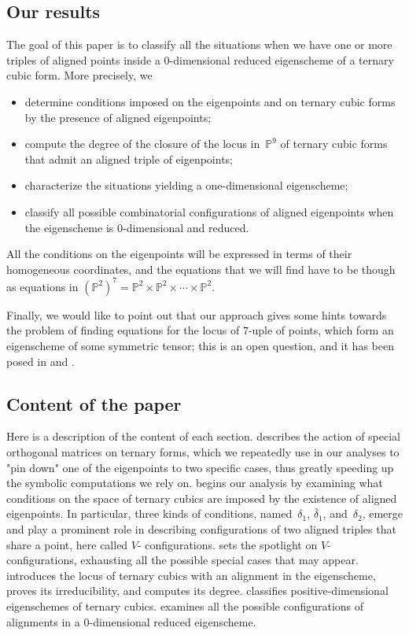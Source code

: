 \documentclass[a4paper, 11pt, reqno]{amsart}
\theoremstyle{plain}
\theoremstyle{definition}
\newcommand{\p}{\mathbb{P}}
\begin{document}
\subsection*{Our results}
The goal of this paper is to classify all the situations when we have one or more triples of aligned points inside a $0$-dimensional reduced eigenscheme of a ternary cubic form.
More precisely, we
%
\begin{itemize}
    \item determine conditions imposed on the eigenpoints and on ternary cubic forms by the presence of aligned eigenpoints;
    \item compute the degree of the closure of the locus in~$\p^9$ of ternary cubic forms that admit an aligned triple of eigenpoints;
    \item characterize the situations yielding a one-dimensional eigenscheme;
    \item classify all possible combinatorial configurations of aligned eigenpoints when the eigenscheme is $0$-dimensional and reduced.
\end{itemize}
%
All the conditions on the eigenpoints will be expressed in terms of their homogeneous coordinates, and the equations that we will find have to be though as equations in $(\p^2)^7=\p^2 \times \p^2 \times \dotsb \times \p^2$.

Finally, we would like to point out that our approach gives some hints towards the problem of finding equations for the locus of $7$-uple of points, which form an eigenscheme of some symmetric tensor; this is an open question, and it has been posed in \cite{ASS} and \cite{Ottaviani24}.

\subsection*{Content of the paper}
Here is a description of the content of each section.
 describes the action of special orthogonal matrices on ternary forms, which we repeatedly use in our analyses to "pin down" one of the eigenpoints to two specific cases, thus greatly speeding up the symbolic computations we rely on.
 begins our analysis by examining what conditions on the space of ternary cubics are imposed by the existence of aligned eigenpoints. In particular, three kinds of conditions, named~$\delta_1$, $\bar{\delta}_1$, and~$\delta_2$, emerge and play a prominent role in describing configurations of two aligned triples that share a point, here called $V$- configurations.
 sets the spotlight on $V$- configurations, exhausting all the possible special cases that may appear.
 introduces the locus of ternary cubics with an alignment in the eigenscheme, proves its irreducibility, and computes its degree.
 classifies positive-dimensional eigenschemes of ternary cubics.
 examines all the possible configurations of alignments in a $0$-dimensional reduced eigenscheme.
\end{document}
